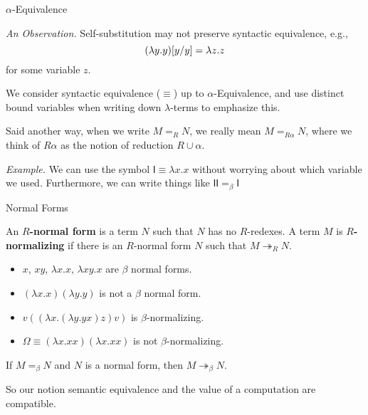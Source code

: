 \documentclass[10pt]{beamer}
\begin{document}
\begin{frame}{$\alpha$-Equivalence}

\textit{An Observation.} Self-substitution may not preserve syntactic equivalence, e.g.,
\begin{displaymath}
(\lambda y. y)[y/y] = \lambda z . z
\end{displaymath}
for some variable $z$.
\nxt

\begin{important}
We consider syntactic equivalence ($\equiv$) up to $\alpha$-Equivalence, and use distinct bound variables when writing down $\lambda$-terms to emphasize this.
\end{important}
\nxt

Said another way, when we write $M =_R N$, we really mean $M =_{R\alpha} N$, where we think of $R\alpha$ as the notion of reduction $R \cup \alpha$.
\nxt

\textit{Example.} We can use the symbol $\mathsf{I} \equiv \lambda x . x$ without worrying about which variable we used. Furthermore, we can write things like $\mathsf{I}\mathsf{I} =_\beta \mathsf{I}$

\end{frame}


\begin{frame}{Normal Forms}
\begin{definition}
An \textbf{$R$-normal form} is a term $N$ such that $N$ has no $R$-redexes.
A term $M$ is \textbf{$R$-normalizing} if there is an $R$-normal form $N$ such that $M \twoheadrightarrow_R N$.
\end{definition}
\nxt

\begin{example}
\begin{itemize}
\item $x$, $xy$, $\lambda x . x$, $\lambda xy . x$ are $\beta$ normal forms.
\item $(\lambda x . x)(\lambda y . y)$ is not a $\beta$ normal form.
\item $v((\lambda x . (\lambda y . yx)z) v)$ is $\beta$-normalizing.
\item $\Omega \equiv (\lambda x . xx)(\lambda x . xx)$ is not $\beta$-normalizing.
\end{itemize}
\end{example}
\nxt

\begin{lemma}
If $M =_\beta N$ and $N$ is a normal form, then $M \twoheadrightarrow_\beta N$.
\end{lemma}
\nxt

So our notion semantic equivalence and the value of a computation are compatible.
\end{frame}
\end{document}
